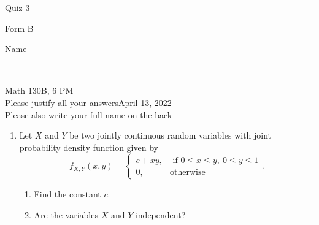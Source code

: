 \documentclass[12pt]{article}
\begin{document}
\begin{flushleft} 
\centerline{\LARGE{Quiz 3}} 
\vspace{5 mm}
{Form B}\hfill  
{Name \rule {2 in}{0.01in}}\\
Math 130B, 6 PM
\\
{Please justify all your answers}\hfill {April 13, 2022}
\\
{Please also write your full name on the back} 

\medskip
\end{flushleft}

\begin{enumerate}

	\item Let $X$ and $Y$ be two jointly continuous random variables with joint probability density function given by
	\[
	f_{X,Y}(x,y) = \begin{cases}
		c + xy, & \text{ if }0\leq x \leq y,\ 0\leq y\leq 1\\
		0, & \text{otherwise}
	\end{cases}.
	\]
	\begin{enumerate}
		\item Find the constant $c$.
		\vfill

		\item Are the variables $X$ and $Y$ independent?
	\end{enumerate}






	\vfill\null
\end{enumerate}
\end{document}
